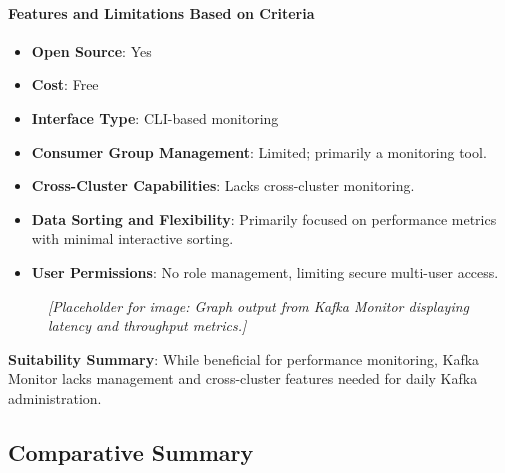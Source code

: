 \documentclass[10pt , a4paper]{report}
\begin{document}
\paragraph{Features and Limitations Based on Criteria}
\begin{itemize} 
    \item \small \textbf{Open Source}: Yes
    \item \small \textbf{Cost}: Free
    \item \small \textbf{Interface Type}: CLI-based monitoring
    \item \small \textbf{Consumer Group Management}: Limited; primarily a monitoring tool.
    \item \small \textbf{Cross-Cluster Capabilities}: Lacks cross-cluster monitoring.
    \item \small \textbf{Data Sorting and Flexibility}: Primarily focused on performance metrics with minimal interactive sorting.
    \item \small \textbf{User Permissions}: No role management, limiting secure multi-user access.
\end{itemize}

\begin{figure}[h] 
\centering 
\textit{[Placeholder for image: Graph output from Kafka Monitor displaying latency and throughput metrics.]} 
\end{figure}

\textbf{Suitability Summary}: While beneficial for performance monitoring, Kafka Monitor lacks management and cross-cluster features needed for daily Kafka administration.

\newpage
\subsection{Comparative Summary}

\begin{table}[h]
\centering
{}
\caption{Comparison of Kafka Management Tools by Feature}
\end{table}
\end{document}

